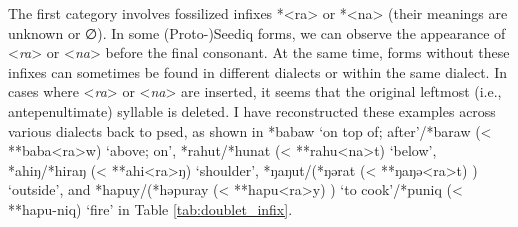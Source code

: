 The first category involves fossilized infixes *<ra> or *<na> (their meanings are unknown or ∅). In some (Proto-)Seediq forms, we can observe the appearance of <\textit{ra}> or <\textit{na}> before the final consonant. At the same time, forms without these infixes can sometimes be found in different dialects or within the same dialect. In cases where <\textit{ra}> or <\textit{na}> are inserted, it seems that the original leftmost (i.e., antepenultimate) syllable is deleted. I have reconstructed these examples across various dialects back to \acl{psed}, as shown in *babaw `on top of; after'/*baraw (< **baba<ra>w) `above; on', *rahut/*hunat (< **rahu<na>t) `below', *ahiŋ/*hiraŋ (< **ahi<ra>ŋ) `shoulder', *ŋaŋut/(*ŋərat (< **ŋaŋə<ra>t) ) `outside', and *hapuy/(*həpuray (< **hapu<ra>y) ) `to cook'/*puniq (< **hapu-niq) `fire' in Table \ref{tab:doublet_infix}.

